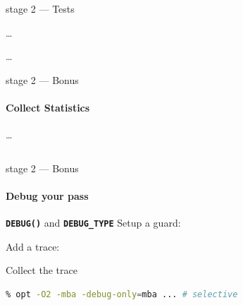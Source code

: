 \documentclass[14pt]{beamer}
\newcommand{\Code}[1]{\textbf{\texttt{#1}}}
\begin{document}
    \begin{frame}[containsverbatim]{stage 2 --- Tests}
    \begin{minipage}{\textwidth}
            \scriptsize
            
            \dots
            
            \dots
            
        \end{minipage}
    \end{frame}


    \begin{frame}[containsverbatim]{stage 2 --- Bonus}
        \framesubtitle{Collect Statistics}
        {
        \footnotesize
        
        }
        \vspace{-1em}%
        \dots\\
        \hspace{-2.5em}%
        \begin{minipage}{\textwidth}
            \footnotesize
            
        \end{minipage}

        {
        \footnotesize
\begin{lstlisting}[language=bash]
% opt -load LLVMMBA.so -mba -stats ...
\end{lstlisting}
        }
    \end{frame}

    \begin{frame}[containsverbatim]{stage 2 --- Bonus}
        \framesubtitle{Debug your pass}
        \begin{alertblock}{\Code{DEBUG()} and \Code{DEBUG\_TYPE}}
        Setup a guard:
        {
        \footnotesize
        
        }
        \vspace{-1em}
        Add a trace:\\
        \hspace{-3.5em}%
        \begin{minipage}{\textwidth}
        \footnotesize
        
        \end{minipage}
        \end{alertblock}
        \begin{block}{Collect the trace}
        {
        \footnotesize
        \begin{lstlisting}[language=bash]
% opt -O2 -mba -debug ... # verbose
% opt -O2 -mba -debug-only=mba ... # selective
        \end{lstlisting}
        }
        \end{block}
    \end{frame}
\end{document}
